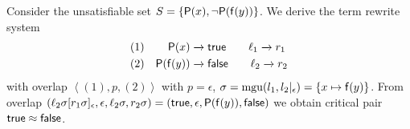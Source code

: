 \begin{example}
	Consider the unsatisfiable set $S = \{ {\mathsf P}(x), \lnot {\mathsf P}({\mathsf f}(y)) \}$. 
	We derive the term rewrite system 
	\begin{align*}
	(1)&&
		\mP(x) &\rwStep \mathsf{true}
		\tag*{$\ell_1 \rwStep r_1$}
		\\
	(2)&&
		\mP(\mf(y)) &\rwStep \mathsf{false}
		\tag*{$\ell_2 \rwStep r_2$}
	\end{align*}
	with overlap $\left<(1),p,(2)\right>$ with $p=\epsilon$, 
	$\sigma = \operatorname{mgu}(l_1, l_2|_\epsilon) = \{ x\mapsto {\mathsf f}(y)\}$.
	From overlap $\left(\ell_2\sigma[r_1\sigma]_\epsilon, \epsilon, \ell_2\sigma, r_2\sigma\right)
	= (\mathsf{true}, \epsilon, {\mathsf P}({\mathsf f}(y)), \mathsf{false})$
	we obtain critical pair $\mathsf{true} \approx \mathsf{false}$.
	
\end{example}





